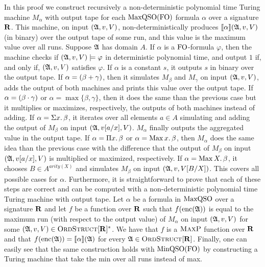 In this proof we construct recursively a non-deterministic polynomial time Turing machine $M_{\alpha}$ with output tape for each ${\rm MaxQSO}({\rm FO})$ formula $\alpha$ over a signature $\mathbf{R}$.
This machine, on input $(\mathfrak{A},v,V)$, non-deterministically produces ${\llbracket{}{\alpha}\rrbracket}(\mathfrak{A},v,V)$ (in binary) over the output tape of some run, and this value is the maximum value over all runs.
Suppose $\mathfrak{A}$ has domain $A$. If $\alpha$ is a ${\rm FO}$-formula $\varphi$, then the machine checks if $(\mathfrak{A},v,V)\models\varphi$ in deterministic polynomial time, and output $1$ if, and only if, $(\mathfrak{A},v,V)$ satisfies $\varphi$. If $\alpha$ is a constant $s$, it outputs $s$ in binary over the output tape. If $\alpha = (\beta + \gamma)$, then it simulates $M_{\beta}$ and $M_{\gamma}$ on input $(\mathfrak{A},v,V)$, adds the output of both machines and prints this value over the output tape. If $\alpha = (\beta \cdot \gamma)$ or $\alpha = \max\{\beta,\gamma\}$, then it does the same than the previous case but it multiplies or maximizes, respectively, the outputs of both machines instead of adding. 
If $\alpha = \Sigma{x}.\,\beta$, it iterates over all elements $a\in A$ simulating and adding the output of $M_{\beta}$ on input $(\mathfrak{A},v[a/x],V)$. $M_{\alpha}$ finally outputs the aggregated value in the output tape. 
If $\alpha = \Pi{x}.\,\beta$ or $\alpha = \operatorname{Max}{x}.\,\beta$, then $M_{\alpha}$ does the same idea than the previous case with the difference that the output of $M_{\beta}$ on input $(\mathfrak{A},v[a/x],V)$ is multiplied or maximized, respectively.
If $\alpha = \operatorname{Max}{X}.\,\beta$, it chooses $B\in A^{arity(X)}$ and simulates $M_{\beta}$ on input $(\mathfrak{A},v,V[B/X])$.
This covers all possible cases for $\alpha$.
Furthermore, it is straightforward to prove that each of these steps are correct and can be computed with a non-deterministic polynomial time Turing machine with output tape.
Let $\alpha$ be a formula in ${\rm MaxQSO}$ over a signature $\mathbf{R}$ and let $f$ be a function over $\mathbf{R}$ such that $f({\rm enc}(\mathfrak{A}))$ is equal to the maximum run (with respect to the output value) of $M_{\alpha}$ on input $(\mathfrak{A},v,V)$ for some $(\mathfrak{A},v,V) \in \text{\sc OrdStruct}[\mathbf{R}]^*$. We have that $f$ is a $\text{\sc MaxP}$ function over $\mathbf{R}$ and that $f({\rm enc}(\mathfrak{A})) = {\llbracket{}{\alpha}\rrbracket}(\mathfrak{A})$ for every $\mathfrak{A}\in\text{\sc OrdStruct}[\mathbf{R}]$.
Finally, one can easily see that the same construction holds with ${\rm MinQSO}({\rm FO})$ by constructing a Turing machine that take the min over all runs instead of max.

